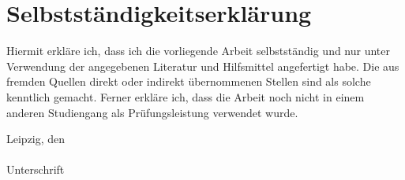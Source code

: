 \section*{Selbstständigkeitserklärung}
Hiermit erkläre ich, dass ich die vorliegende Arbeit selbstständig und nur unter Verwendung
der angegebenen Literatur und Hilfsmittel angefertigt habe. 
Die aus fremden Quellen direkt
oder indirekt übernommenen Stellen sind als solche kenntlich gemacht. 
Ferner erkläre ich,
dass die Arbeit noch nicht in einem anderen Studiengang als Prüfungsleistung verwendet
wurde.

\vspace{2cm}
\begin{flushleft}
    Leipzig, den  \\
    \vspace{2cm}
    \underline{\hspace{6cm}} \\
    Unterschrift
\end{flushleft}